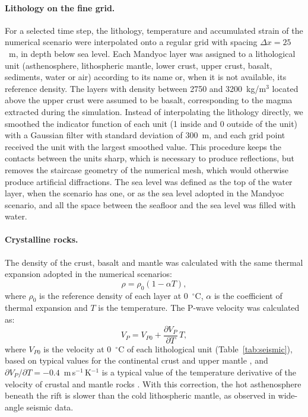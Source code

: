 \paragraph{Lithology on the fine grid.}
For a selected time step, the lithology, temperature and accumulated strain of the numerical
scenario were interpolated onto a regular grid with spacing $\Delta x = 25$~m, in depth below
sea level. Each Mandyoc layer was assigned to a lithological unit (asthenosphere, lithospheric
mantle, lower crust, upper crust, basalt, sediments, water or air) according to its name or,
when it is not available, its reference density. The layers with density between 2750 and
3200~kg/m$^3$ located above the upper crust were assumed to be basalt, corresponding to the
magma extracted during the simulation. Instead of interpolating the lithology directly, we
smoothed the indicator function of each unit (1 inside and 0 outside of the unit) with a
Gaussian filter with standard deviation of 300~m, and each grid point received the unit with
the largest smoothed value. This procedure keeps the contacts between the units sharp, which
is necessary to produce reflections, but removes the staircase geometry of the numerical mesh,
which would otherwise produce artificial diffractions. The sea level was defined as the top of
the water layer, when the scenario has one, or as the sea level adopted in the Mandyoc
scenario, and all the space between the seafloor and the sea level was filled with water.

\paragraph{Crystalline rocks.}
The density of the crust, basalt and mantle was calculated with the same thermal expansion
adopted in the numerical scenarios:
\begin{equation}
  \rho = \rho_0 (1 - \alpha T),
  \label{eq:seismic_density}
\end{equation}
where $\rho_0$ is the reference density of each layer at 0~$^\circ$C, $\alpha$ is the
coefficient of thermal expansion and $T$ is the temperature. The P-wave velocity was
calculated as:
\begin{equation}
  V_P = V_{P0} + \frac{\partial V_P}{\partial T}\, T,
  \label{eq:seismic_vp}
\end{equation}
where $V_{P0}$ is the velocity at 0~$^\circ$C of each lithological unit (Table~\ref{tab:seismic}),
based on typical values for the continental crust and upper mantle
\citep{Christensen1995}, and $\partial V_P / \partial T = -0.4$~m\,s$^{-1}$\,K$^{-1}$ is a
typical value of the temperature derivative of the velocity of crustal and mantle rocks
\citep{Christensen1979}. With this correction, the hot asthenosphere beneath the rift is
slower than the cold lithospheric mantle, as observed in wide-angle seismic data.

